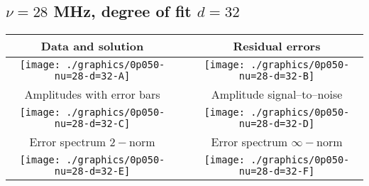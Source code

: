 

% 

\clearpage{}
\break{}

\subsection{$\nu = 28$ MHz, degree of fit $d = 32$}

\begin{table}[h]
    \begin{center}
        \begin{tabular}{ccc}
            Data and solution & \quad & Residual errors \\\hline
            \texttt{[image: ./graphics/0p050-nu=28-d=32-A]} &&
            \texttt{[image: ./graphics/0p050-nu=28-d=32-B]} \\[15pt]
            Amplitudes with error bars && Amplitude signal--to--noise \\\hline
            \texttt{[image: ./graphics/0p050-nu=28-d=32-C]} &&
            \texttt{[image: ./graphics/0p050-nu=28-d=32-D]} \\[15pt]
            Error spectrum $2-$norm && Error spectrum $\infty-$norm \\\hline
            \texttt{[image: ./graphics/0p050-nu=28-d=32-E]} &&
            \texttt{[image: ./graphics/0p050-nu=28-d=32-F]} \\[15pt]
        \end{tabular}
    \end{center}
\label{fig:elev=50, nu=28}
\end{table}



\endinput

